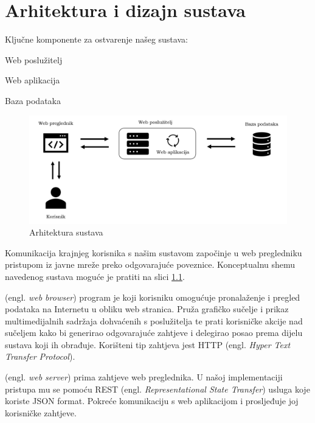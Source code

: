 \chapter{Arhitektura i dizajn sustava}

		
	\noindent Ključne komponente za ostvarenje našeg sustava: 
	   \begin{packed_item}
	        \item Web poslužitelj 
	        \item Web aplikacija 
	        \item Baza podataka
	    \end{packed_item}
	    
	
	\begin{figure}[H]
		\includegraphics[scale=0.48]{slike/system-architecture.PNG} 
		\centering
		\caption{Arhitektura sustava}
		\label{fig:arhitektura}
	\end{figure}
		
	\noindent Komunikacija krajnjeg korisnika s našim sustavom započinje u web pregledniku pristupom iz javne mreže preko odgovarajuće poveznice. Konceptualnu shemu navedenog sustava moguće je pratiti na slici \ref{fig:arhitektura}.	 \par
	
	\medskip
	
	\noindent {} (engl. \textit{web browser}) program je koji korisniku omogućuje pronalaženje i pregled podataka na Internetu u obliku web stranica. Pruža grafičko sučelje i prikaz multimedijalnih sadržaja dohvaćenih s poslužitelja te prati korisničke akcije nad sučeljem kako bi generirao odgovarajuće zahtjeve i delegirao posao prema dijelu sustava koji ih obrađuje. Korišteni tip zahtjeva jest HTTP (engl. \textit{Hyper Text Transfer Protocol}). \par
	
	\medskip
	
	\noindent {} (engl. \textit{web server}) prima zahtjeve web preglednika. U našoj implementaciji pristupa mu se pomoću REST (engl. \textit{Representational State Transfer}) usluga koje koriste JSON format. Pokreće komunikaciju s web aplikacijom i prosljeđuje joj korisničke zahtjeve.  \par
	
